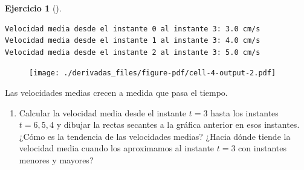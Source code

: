 \documentclass[
  a4paper,
]{scrreport}
\newenvironment{Shaded}{\begin{snugshade}}{\end{snugshade}}
\newcommand{\CommentTok}[1]{\textcolor[rgb]{0.37,0.37,0.37}{#1}}
\newcommand{\ControlFlowTok}[1]{\textcolor[rgb]{0.00,0.23,0.31}{#1}}
\newcommand{\FloatTok}[1]{\textcolor[rgb]{0.68,0.00,0.00}{#1}}
\newcommand{\FunctionTok}[1]{\textcolor[rgb]{0.28,0.35,0.67}{#1}}
\newcommand{\KeywordTok}[1]{\textcolor[rgb]{0.00,0.23,0.31}{#1}}
\newcommand{\NormalTok}[1]{\textcolor[rgb]{0.00,0.23,0.31}{#1}}
\newcommand{\OperatorTok}[1]{\textcolor[rgb]{0.37,0.37,0.37}{#1}}
\newcommand{\SpecialCharTok}[1]{\textcolor[rgb]{0.37,0.37,0.37}{#1}}
\newcommand{\StringTok}[1]{\textcolor[rgb]{0.13,0.47,0.30}{#1}}
\providecommand{\tightlist}{%
  \setlength{\itemsep}{0pt}\setlength{\parskip}{0pt}}\usepackage{longtable,booktabs,array}
\theoremstyle{definition}
\newtheorem{exercise}{Ejercicio}[chapter]
\theoremstyle{remark}
\begin{document}
\begin{exercise}[]
\begin{tcolorbox}
\begin{Shaded}
\end{Shaded}

\begin{verbatim}
Velocidad media desde el instante 0 al instante 3: 3.0 cm/s
Velocidad media desde el instante 1 al instante 3: 4.0 cm/s
Velocidad media desde el instante 2 al instante 3: 5.0 cm/s
\end{verbatim}

\begin{figure}[H]

{\centering \texttt{[image: ./derivadas\_files/figure-pdf/cell-4-output-2.pdf]}

}

\end{figure}

Las velocidades medias crecen a medida que pasa el tiempo.

\end{tcolorbox}

\begin{enumerate}
\def\labelenumi{\alph{enumi}.}
\setcounter{enumi}{2}
\tightlist
\item
  Calcular la velocidad media desde el instante \(t=3\) hasta los
  instantes \(t=6, 5, 4\) y dibujar la rectas secantes a la gráfica
  anterior en esos instantes. ¿Cómo es la tendencia de las velocidades
  medias? ¿Hacia dónde tiende la velocidad media cuando los aproximamos
  al instante \(t=3\) con instantes menores y mayores?
\end{enumerate}


\end{exercise}
\end{document}
